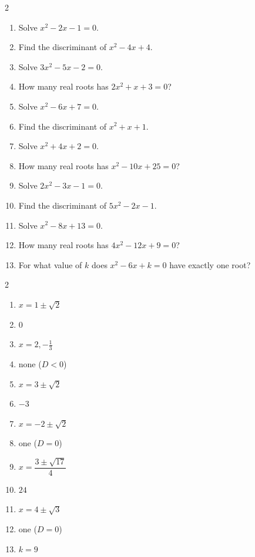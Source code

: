 \documentclass[11pt]{article}
\begin{document}
\begin{recapbox}
\begin{multicols}{2}
\small
\begin{enumerate}[leftmargin=*,itemsep=3pt]
  \item Solve $x^2-2x-1=0$.
  \item Find the discriminant of $x^2-4x+4$.
  \item Solve $3x^2-5x-2=0$.
  \item How many real roots has $2x^2+x+3=0$?
  \item Solve $x^2-6x+7=0$.
  \item Find the discriminant of $x^2+x+1$.
  \item Solve $x^2+4x+2=0$.
  \item How many real roots has $x^2-10x+25=0$?
  \item Solve $2x^2-3x-1=0$.
  \item Find the discriminant of $5x^2-2x-1$.
  \item Solve $x^2-8x+13=0$.
  \item How many real roots has $4x^2-12x+9=0$?
  \item For what value of $k$ does $x^2-6x+k=0$ have exactly one root?
\end{enumerate}
\end{multicols}
\end{recapbox}

\begin{keybox}
\begin{multicols}{2}
\small
\begin{enumerate}[leftmargin=*,itemsep=3pt]
  \item $x=1\pm\sqrt2$
  \item $0$
  \item $x=2,-\tfrac13$
  \item none ($D<0$)
  \item $x=3\pm\sqrt2$
  \item $-3$
  \item $x=-2\pm\sqrt2$
  \item one ($D=0$)
  \item $x=\dfrac{3\pm\sqrt{17}}{4}$
  \item $24$
  \item $x=4\pm\sqrt3$
  \item one ($D=0$)
  \item $k=9$
\end{enumerate}
\end{multicols}
\end{keybox}
\end{document}
